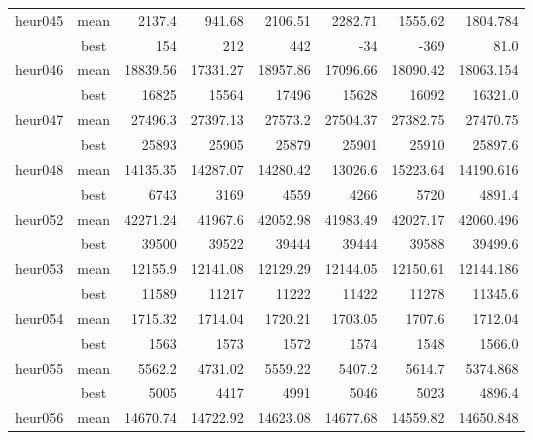 \documentclass[a4paper,12pt]{article}
\begin{document}
\begin{table}[H]
\begin{tabular}{l|c|r|r|r|r|r|r}
        \hline
        heur045 & mean & 2137.4 & 941.68  & 2106.51 & 2282.71 & 1555.62 & 1804.784 \\%
                & best & 154    & 212     & 442     & -34     & -369    & 81.0 \\ %
        \hline
        heur046 & mean & 18839.56 & 17331.27 & 18957.86 & 17096.66 & 18090.42 & 18063.154 \\%
                & best & 16825    & 15564    & 17496    & 15628    & 16092    & 16321.0 \\ %
        \hline
        heur047 & mean & 27496.3  & 27397.13 & 27573.2  & 27504.37 & 27382.75 & 27470.75\\%
                & best & 25893    & 25905    & 25879    & 25901    & 25910    &  25897.6 \\ %
        \hline
        heur048 & mean & 14135.35 & 14287.07 & 14280.42 & 13026.6  & 15223.64 & 14190.616\\%
                & best & 6743     &  3169    & 4559     & 4266     & 5720     &  4891.4 \\ %
        \hline
        heur052 & mean & 42271.24 & 41967.6 & 42052.98 & 41983.49 & 42027.17 & 42060.496 \\
                & best & 39500 & 39522 & 39444 & 39444 & 39588 & 39499.6 \\
        \hline
        heur053 & mean & 12155.9 & 12141.08 & 12129.29 & 12144.05 & 12150.61 & 12144.186\\
                & best & 11589 & 11217 & 11222 & 11422 & 11278 & 11345.6\\
        \hline
        heur054 & mean & 1715.32 & 1714.04 & 1720.21 & 1703.05 & 1707.6 & 1712.04 \\
                & best & 1563 & 1573 & 1572 & 1574 & 1548 & 1566.0 \\
        \hline
        heur055 & mean & 5562.2 & 4731.02 & 5559.22 & 5407.2 & 5614.7 & 5374.868 \\
                & best & 5005 & 4417 & 4991 & 5046 & 5023 & 4896.4\\
        \hline
        heur056 & mean & 14670.74 & 14722.92 & 14623.08 & 14677.68 & 14559.82 & 14650.848 \\

\end{tabular}
\end{table}
\end{document}
